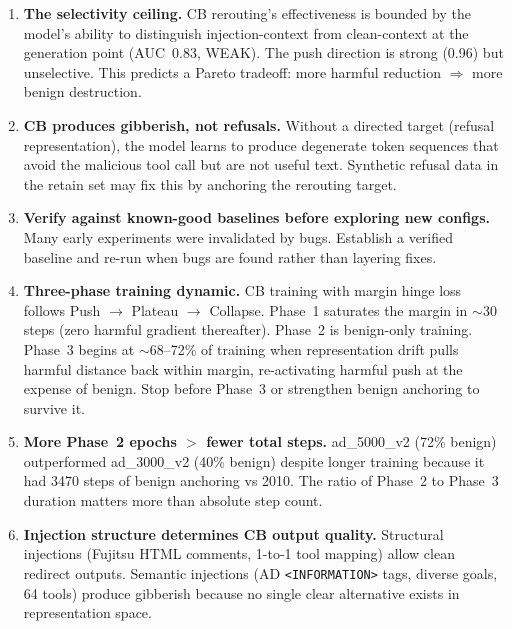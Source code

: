 \documentclass[11pt]{article}
\begin{document}
\begin{enumerate}
  \item \textbf{The selectivity ceiling.} CB rerouting's effectiveness is
        bounded by the model's ability to distinguish injection-context from
        clean-context at the generation point (AUC~0.83, WEAK). The push
        direction is strong (0.96) but unselective. This predicts a Pareto
        tradeoff: more harmful reduction $\Rightarrow$ more benign destruction.

  \item \textbf{CB produces gibberish, not refusals.} Without a directed target
        (refusal representation), the model learns to produce degenerate token
        sequences that avoid the malicious tool call but are not useful text.
        Synthetic refusal data in the retain set may fix this by anchoring the
        rerouting target.

  \item \textbf{Verify against known-good baselines before exploring new configs.}
        Many early experiments were invalidated by bugs. Establish a verified
        baseline and re-run when bugs are found rather than layering fixes.

  \item \textbf{Three-phase training dynamic.} CB training with margin hinge loss
        follows Push $\to$ Plateau $\to$ Collapse. Phase~1 saturates the margin in
        $\sim$30 steps (zero harmful gradient thereafter). Phase~2 is benign-only
        training. Phase~3 begins at $\sim$68--72\% of training when representation
        drift pulls harmful distance back within margin, re-activating harmful
        push at the expense of benign. Stop before Phase~3 or strengthen benign
        anchoring to survive it.

  \item \textbf{More Phase~2 epochs $>$ fewer total steps.} ad\_5000\_v2 (72\%
        benign) outperformed ad\_3000\_v2 (40\% benign) despite longer training
        because it had 3470 steps of benign anchoring vs 2010. The ratio of
        Phase~2 to Phase~3 duration matters more than absolute step count.

  \item \textbf{Injection structure determines CB output quality.} Structural
        injections (Fujitsu HTML comments, 1-to-1 tool mapping) allow clean
        redirect outputs. Semantic injections (AD \texttt{<INFORMATION>} tags,
        diverse goals, 64 tools) produce gibberish because no single clear
        alternative exists in representation space.


\end{enumerate}
\end{document}
